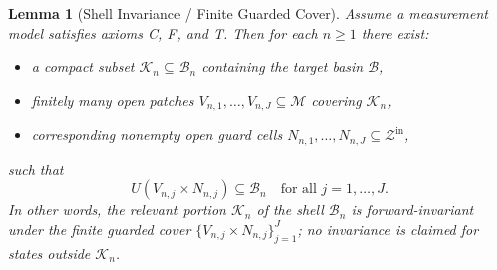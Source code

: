 \documentclass[12pt]{article}
\theoremstyle{definition}
\theoremstyle{plain}
\newtheorem{lemma}{Lemma}[section]
\begin{document}
\begin{lemma}[Shell Invariance / Finite Guarded Cover]\label{lem:shell-invariance}
Assume a measurement model satisfies axioms C, F, and T.
Then for each \(n\ge1\) there exist:
\begin{itemize}
  \item a compact subset \(\mathcal{K}_n \subseteq \mathcal{B}_n\) containing the target basin \(\mathcal{B}\),
  \item finitely many open patches \(V_{n,1},\dots,V_{n,J} \subseteq \mathcal{M}\) covering \(\mathcal{K}_n\),
  \item corresponding nonempty open \emph{guard cells} \(N_{n,1},\dots,N_{n,J} \subseteq \mathcal{Z}^{\mathrm{in}}\),
\end{itemize}
such that
\[
   U(V_{n,j} \times N_{n,j}) \subseteq \mathcal{B}_n
   \quad\text{for all } j=1,\dots,J.
\]
In other words, the relevant portion \(\mathcal{K}_n\) of the shell \(\mathcal{B}_n\) is forward-invariant under the finite guarded cover \(\{V_{n,j}\times N_{n,j}\}_{j=1}^J\); no invariance is claimed for states outside \(\mathcal{K}_n\).
\end{lemma}
\end{document}
